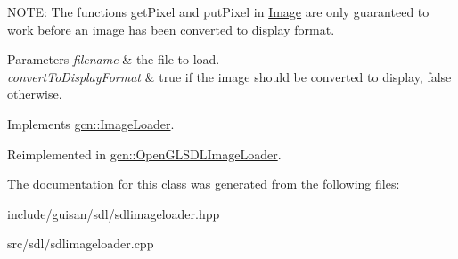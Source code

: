 N\+O\+TE\+: The functions get\+Pixel and put\+Pixel in \hyperlink{classgcn_1_1Image}{Image} are only guaranteed to work before an image has been converted to display format.


\begin{DoxyParams}{Parameters}
{\em filename} & the file to load. \\
\hline
{\em convert\+To\+Display\+Format} & true if the image should be converted to display, false otherwise. \\
\hline
\end{DoxyParams}


Implements \hyperlink{classgcn_1_1ImageLoader_abd4eab9b35af93047de5da28ba1b66bf}{gcn\+::\+Image\+Loader}.



Reimplemented in \hyperlink{classgcn_1_1OpenGLSDLImageLoader_a3ee1cd01621f93752de27311a376043a}{gcn\+::\+Open\+G\+L\+S\+D\+L\+Image\+Loader}.



The documentation for this class was generated from the following files\+:\begin{DoxyCompactItemize}
\item 
include/guisan/sdl/sdlimageloader.\+hpp\item 
src/sdl/sdlimageloader.\+cpp\end{DoxyCompactItemize}

